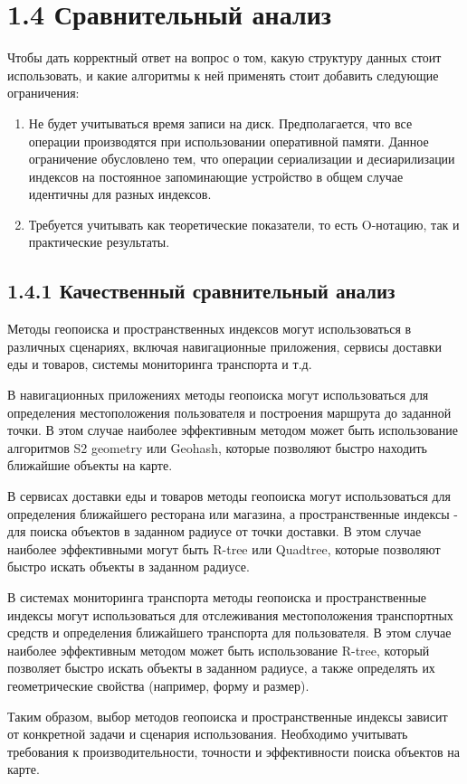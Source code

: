 \section{1.4 Сравнительный анализ}
Чтобы дать корректный ответ на вопрос о том, какую структуру данных стоит использовать, и какие алгоритмы к ней применять стоит добавить следующие ограничения:
\begin{enumerate}
    \item Не будет учитываться время записи на диск. Предполагается, что все операции производятся при использовании оперативной памяти. Данное ограничение обусловлено тем, что операции сериализации и десиарилизации индексов на постоянное запоминающие устройство в общем случае идентичны для разных индексов. 
    \item Требуется учитывать как теоретические показатели, то есть O-нотацию, так и практические результаты.
\end{enumerate}


\subsection{1.4.1 Качественный сравнительный анализ}
Методы геопоиска и пространственных индексов могут использоваться в различных сценариях, включая навигационные приложения, сервисы доставки еды и товаров, системы мониторинга транспорта и т.д.

В навигационных приложениях методы геопоиска могут использоваться для определения местоположения пользователя и построения маршрута до заданной точки. В этом случае наиболее эффективным методом может быть использование алгоритмов S2 geometry или Geohash, которые позволяют быстро находить ближайшие объекты на карте. 

В сервисах доставки еды и товаров методы геопоиска могут использоваться для определения ближайшего ресторана или магазина, а пространственные индексы - для поиска объектов в заданном радиусе от точки доставки. В этом случае наиболее эффективными могут быть R-tree или Quadtree, которые позволяют быстро искать объекты в заданном радиусе. 

В системах мониторинга транспорта методы геопоиска и пространственные индексы могут использоваться для отслеживания местоположения транспортных средств и определения ближайшего транспорта для пользователя. В этом случае наиболее эффективным методом может быть использование R-tree, который позволяет быстро искать объекты в заданном радиусе, а также определять их геометрические свойства (например, форму и размер). 

Таким образом, выбор методов геопоиска и пространственные индексы зависит от конкретной задачи и сценария использования. Необходимо учитывать требования к производительности, точности и эффективности поиска объектов на карте. 

